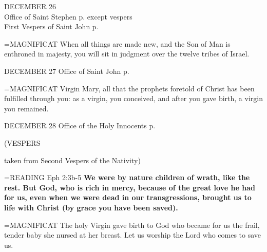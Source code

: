 \begin{center}\normalsize DECEMBER 26\\
\footnotesize Office of Saint Stephen p. \pageref{propers:stephen} except vespers\\
\footnotesize First Vespers of Saint John p. \pageref{propers:john}\\
\end{center}

\hangindent=\parindent \small{MAGNIFICAT 	When all things are made new, and the Son of Man is enthroned in majesty, you will sit in judgment over the twelve tribes of Israel.\\}

DECEMBER 27
Office of Saint John p. \pageref{propers:john}

\hangindent=\parindent \small{MAGNIFICAT 	Virgin Mary, all that the prophets foretold of Christ has been fulfilled through you: as a virgin, you conceived, and after you gave birth, a virgin you remained.\\}

DECEMBER 28
Office of the Holy Innocents p. \pageref{propers:holyinnocents}
\begin{flushleft}\normalsize (VESPERS\\\end{flushleft} taken from Second Vespers of the Nativity)

\hangindent=\parindent \small{READING}    Eph 2:3b-5 \textbf{   We were by nature children of wrath, like the rest. But God, who is rich in mercy, because of the great love he had for us, even when we were dead in our transgressions, brought us to life with Christ (by grace you have been saved).\\}

\hangindent=\parindent \small{MAGNIFICAT 	The holy Virgin gave birth to God who became for us the frail, tender baby she nursed at her breast. Let us worship the Lord who comes to save us.\\}
